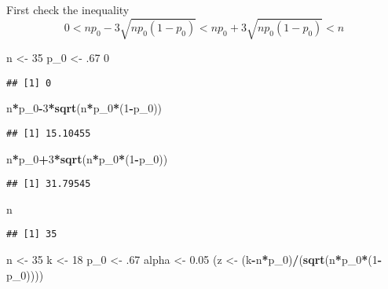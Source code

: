 \documentclass[]{article}
\newenvironment{Shaded}{\begin{snugshade}}{\end{snugshade}}
\newcommand{\KeywordTok}[1]{\textcolor[rgb]{0.13,0.29,0.53}{\textbf{#1}}}
\newcommand{\DecValTok}[1]{\textcolor[rgb]{0.00,0.00,0.81}{#1}}
\newcommand{\FloatTok}[1]{\textcolor[rgb]{0.00,0.00,0.81}{#1}}
\newcommand{\StringTok}[1]{\textcolor[rgb]{0.31,0.60,0.02}{#1}}
\newcommand{\OperatorTok}[1]{\textcolor[rgb]{0.81,0.36,0.00}{\textbf{#1}}}
\newcommand{\NormalTok}[1]{#1}
\begin{document}
First check the inequality \[
0 < np_0-3\sqrt{np_0(1-p_0)}<np_0+3\sqrt{np_0(1-p_0)}<n
\]

\begin{Shaded}
\begin{Highlighting}[]
\NormalTok{n <-}\StringTok{ }\DecValTok{35}
\NormalTok{p_}\DecValTok{0}\NormalTok{ <-}\StringTok{ }\NormalTok{.}\DecValTok{67}
\DecValTok{0}
\end{Highlighting}
\end{Shaded}

\begin{verbatim}
## [1] 0
\end{verbatim}

\begin{Shaded}
\begin{Highlighting}[]
\NormalTok{n}\OperatorTok{*}\NormalTok{p_}\DecValTok{0}\OperatorTok{-}\DecValTok{3}\OperatorTok{*}\KeywordTok{sqrt}\NormalTok{(n}\OperatorTok{*}\NormalTok{p_}\DecValTok{0}\OperatorTok{*}\NormalTok{(}\DecValTok{1}\OperatorTok{-}\NormalTok{p_}\DecValTok{0}\NormalTok{))}
\end{Highlighting}
\end{Shaded}

\begin{verbatim}
## [1] 15.10455
\end{verbatim}

\begin{Shaded}
\begin{Highlighting}[]
\NormalTok{n}\OperatorTok{*}\NormalTok{p_}\DecValTok{0}\OperatorTok{+}\DecValTok{3}\OperatorTok{*}\KeywordTok{sqrt}\NormalTok{(n}\OperatorTok{*}\NormalTok{p_}\DecValTok{0}\OperatorTok{*}\NormalTok{(}\DecValTok{1}\OperatorTok{-}\NormalTok{p_}\DecValTok{0}\NormalTok{))}
\end{Highlighting}
\end{Shaded}

\begin{verbatim}
## [1] 31.79545
\end{verbatim}

\begin{Shaded}
\begin{Highlighting}[]
\NormalTok{n}
\end{Highlighting}
\end{Shaded}

\begin{verbatim}
## [1] 35
\end{verbatim}

\begin{Shaded}
\begin{Highlighting}[]
\NormalTok{n <-}\StringTok{ }\DecValTok{35}
\NormalTok{k <-}\StringTok{ }\DecValTok{18}
\NormalTok{p_}\DecValTok{0}\NormalTok{ <-}\StringTok{ }\NormalTok{.}\DecValTok{67}
\NormalTok{alpha <-}\StringTok{ }\FloatTok{0.05}
\NormalTok{(z <-}\StringTok{ }\NormalTok{(k}\OperatorTok{-}\NormalTok{n}\OperatorTok{*}\NormalTok{p_}\DecValTok{0}\NormalTok{)}\OperatorTok{/}\NormalTok{(}\KeywordTok{sqrt}\NormalTok{(n}\OperatorTok{*}\NormalTok{p_}\DecValTok{0}\OperatorTok{*}\NormalTok{(}\DecValTok{1}\OperatorTok{-}\NormalTok{p_}\DecValTok{0}\NormalTok{))))}
\end{Highlighting}
\end{Shaded}
\end{document}
